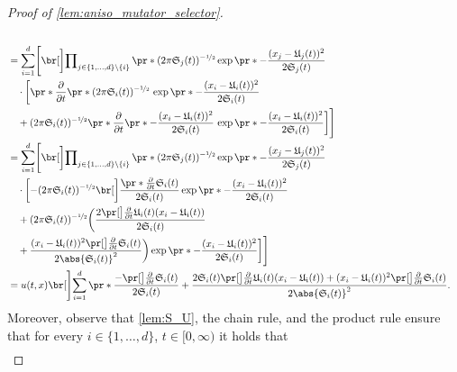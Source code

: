 \begin{proof}[Proof of \cref{lem:aniso_mutator_selector}]
\begin{align}
			\\ & = \notag
			\sum_{i=1}^d \Biggl[  \bbbbr{ \prod\nolimits_{ j \in \{ 1,\dots,d \} \backslash\{i\}} \pr*{ (2\pi \mathfrak{S}_j(t))^{-\nicefrac{1}{2}} \exp \pr*{ - \frac{(x_j -\mathfrak{U}_j(t) )^2}{2\mathfrak{S}_j(t)}} }}\\\notag
			&\quad \cdot \biggl[\pr*{ \frac{\partial}{\partial t} \pr*{ (2\pi   \mathfrak{S}_i(t))^{-\nicefrac{1}{2}} } } \, \exp\pr*{- \frac{(x_i -\mathfrak{U}_i(t) )^2}{2\mathfrak{S}_i(t)}} \\\notag
			&\quad + (2\pi   \mathfrak{S}_i(t))^{-\nicefrac{1}{2}}  \pr*{ \frac{\partial}{\partial t}  \pr*{ - \frac{(x_i -\mathfrak{U}_i(t) )^2}{2\mathfrak{S}_i(t)} } }\,\exp\pr*{- \frac{(x_i -\mathfrak{U}_i(t) )^2}{2\mathfrak{S}_i(t)}}  \biggr] \Biggr] 
			\\ &=  \label{lem:derivatives1}
			\sum_{i=1}^d \Biggl[  \bbbbr{ \prod\nolimits_{ j \in \{ 1, \dots,d \} \backslash\{i\}} \pr*{ (2\pi \mathfrak{S}_j(t))^{-\nicefrac{1}{2}} \exp\pr*{ - \frac{(x_j -\mathfrak{U}_j(t) )^2}{2\mathfrak{S}_j(t)}} }}\\\notag
			&\quad \cdot \biggl[   - (2\pi  \mathfrak{S}_i(t))^{-\nicefrac{1}{2}} \bbbbr{\frac{\pr*{ \tfrac{\partial }{\partial t}\mathfrak{S}_i} (t)}{2\mathfrak{S}_i(t)}} \exp\pr*{- \frac{(x_i -\mathfrak{U}_i(t) )^2}{2\mathfrak{S}_i(t)}} \\\notag
			&\quad +  (2\pi  \mathfrak{S}_i(t))^{-\nicefrac{1}{2}} \biggl(  \frac{ 2\bpr{\tfrac{\partial }{\partial t}\mathfrak{U}_i}(t)(x_i-\mathfrak{U_i}(t))}{2\mathfrak{S}_i(t)} \\\notag
			&\quad  + \frac{(x_i-\mathfrak{U}_i(t))^2 \bpr{\tfrac{\partial }{\partial t}\mathfrak{S}_i}(t)}{2\abs{\mathfrak{S}_i(t)}^{2}} \biggr) \exp\pr*{- \frac{(x_i -\mathfrak{U}_i(t) )^2}{2\mathfrak{S}_i(t)}} \biggr] \Biggr] 
			\\ &= \notag
			u(t,x) \bbbbbr{ \sum_{i=1}^d\pr*{ \frac{-\bpr{\tfrac{\partial }{\partial t}\mathfrak{S}_i} (t)}{2\mathfrak{S}_i(t)} +
			\frac{ 2\mathfrak{S}_i(t) \bpr{\tfrac{\partial }{\partial t}\mathfrak{U}_i}(t)(x_i-\mathfrak{U_i}(t)) + (x_i-\mathfrak{U}_i(t))^2 \bpr{\tfrac{\partial }{\partial t}\mathfrak{S}_i}(t)}{2\abs{\mathfrak{S}_i(t)}^{2}}} }
			.
		\end{align}
	Moreover, observe that 
		\eqref{lem:S_U}, 
		the chain rule, 
		and the product rule 
	ensure that 
		for every
			$i \in \{1, \dots,d\}$,
			$t \in [0,\infty)$
		it holds that
		\begin{equation}
		\begin{aligned}

\end{aligned}
\end{equation}
\end{proof}
